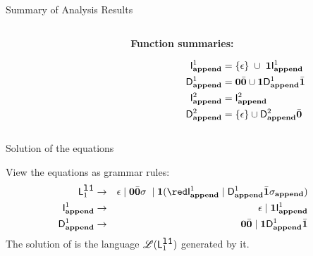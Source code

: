 \documentclass[xcolor=x11names,compress,mathserif]{beamer}
\renewcommand{\(}{\begin{columns}}
\renewcommand{\)}{\end{columns}}
\newcommand{\<}[1]{\begin{column}{#1}}
\renewcommand{\>}{\end{column}}
\begin{document}
\begin{frame}[t]{Summary of Analysis Results}
\begin{columns}[c]
\begin{column}[T]{0.33\textwidth}
\end{column}
\begin{column}[T]{0.33\textwidth}
\vspace*{1.5cm}
\centerline{\bf Function summaries:}
{\red
\begin{align*}
        \mathsf{I}_{\mathit {\mathbf{append}}}^{1} &= \{\epsilon\}\;  \cup\;
      \mathbf{1}\mathsf{I}_{\mathit {\mathbf{append}}}^{1}\\
  \mathsf{D}_{\mathit {\mathbf{append}}}^{1} &= \mathbf{0}\bar{\mathbf{0}}\cup\mathbf{1} \mathsf{D}_{\mathit {\mathbf{append}}}^{1}\bar{\mathbf{1}}\\
  \mathsf{I}_{\mathit {\mathbf{append}}}^{2} &= \mathsf{I}_{\mathit {\mathbf{append}}}^{2}\\
  \mathsf{D}_{\mathit {\mathbf{append}}}^{2} &= \{\epsilon\} \cup \mathsf{D}_{\mathit {\mathbf{append}}}^{2}\bar{\mathbf{0}}
  \end{align*}}
  \end{column}
\end{columns}
\end{frame}

\begin{frame}{Solution of the equations}

  View the equations as grammar rules:
\begin{eqnarray*}
    \Lanv{1}{\lista} &\rightarrow& \epsilon \mid  \acar\bcar\sigma\; \mid 
    \acdr({\red \Uf{\append}{1} \mid \Df{\append}{1}\bcdr\sigma_{\append}})\\
  \Uf{\append}{1}    &\rightarrow&    \epsilon   \mid
   \acdr{\Uf{\append}{1}}\\         
   \Df{\append}{1}
   &\rightarrow&               \acar\bcar               \mid
   \acdr\Df{\append}{1}\bcdr\\
 \end{eqnarray*}
The  solution of  is the   language  $\mathscr{L}(\mathsf{L}_{{1}}^{\mbox{\tt l1}})$ generated    by    it.
\end{frame}

\end{document}
